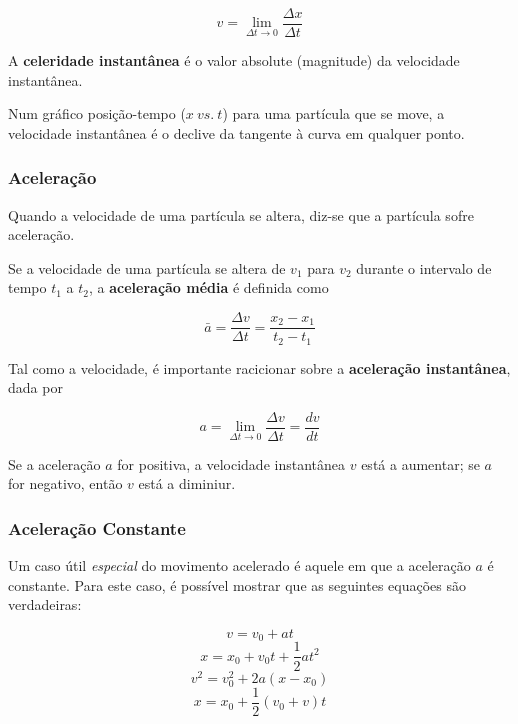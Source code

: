 \begin{equation}
    v=\lim_{\Delta t \to 0}\frac{\Delta x}{\Delta t}
\end{equation}

A \textbf{celeridade instantânea} é o valor absolute (magnitude) da velocidade instantânea.

Num gráfico posição-tempo ($x\ vs.\ t$) para uma partícula que se move, a velocidade instantânea é o declive da tangente à curva em qualquer ponto.

\subsubsection{Aceleração}
Quando a velocidade de uma partícula se altera, diz-se que a partícula sofre aceleração.

Se a velocidade de uma partícula se altera de $v_1$ para $v_2$ durante o intervalo de tempo $t_1$ a $t_2$, a \textbf{aceleração média} é definida como

\begin{equation}
    \bar{a}=\frac{\Delta v}{\Delta t}=\frac{x_2-x_1}{t_2-t_1}
\end{equation}

Tal como a velocidade, é importante racicionar sobre a \textbf{aceleração instantânea}, dada por

\begin{equation}
    a=\lim_{\Delta t \to 0}\frac{\Delta v}{\Delta t}=\frac{dv}{dt}
\end{equation}

Se a aceleração $a$ for positiva, a velocidade instantânea $v$ está a aumentar; se $a$ for negativo, então $v$ está a diminiur.

\subsubsection{Aceleração Constante}
Um caso útil \emph{especial} do movimento acelerado é aquele em que a aceleração $a$ é constante. Para este caso, é possível mostrar que as seguintes equações são verdadeiras:

\begin{equation}
    v=v_0+at
\end{equation}
\begin{equation}
    x=x_0+v_0t+\frac{1}{2}at^2
\end{equation}
\begin{equation}
    v^2=v_0^2+2a(x-x_0)
\end{equation}
\begin{equation}
    x=x_0+\frac{1}{2}(v_0+v)t
\end{equation}

